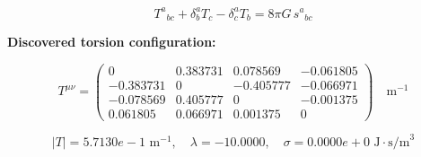 
\begin{equation}
  T^a{}_{bc} + \delta^a_b T_c - \delta^a_c T_b = 8\pi G \, s^a{}_{bc}
\end{equation}

\textbf{Discovered torsion configuration:}

\begin{equation}
  T^{\mu\nu} = \begin{pmatrix}
    0 & 0.383731 & 0.078569 & -0.061805 \\
    -0.383731 & 0 & -0.405777 & -0.066971 \\
    -0.078569 & 0.405777 & 0 & -0.001375 \\
    0.061805 & 0.066971 & 0.001375 & 0
  \end{pmatrix} \quad \text{m}^{-1}
\end{equation}

\begin{equation}
  |T| = 5.7130e-1 \text{ m}^{-1}, \quad
  \lambda = -10.0000, \quad
  \sigma = 0.0000e+0 \text{ J}\cdot\text{s/m}^3
\end{equation}